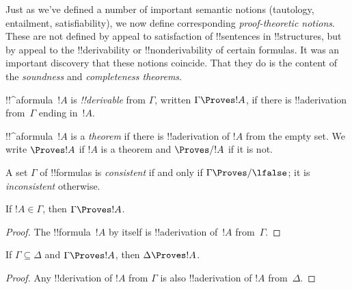

\begin{explain}
Just as we've defined a number of important semantic notions
(tautology, entailment, satisfiability), we now
define corresponding \emph{proof-theoretic notions}.  These are not
defined by appeal to satisfaction of !!{sentence}s in !!{structure}s,
but by appeal to the !!{derivability} or !!{nonderivability} of
certain formulas.  It was an important discovery that these notions
coincide.  That they do is the content of the \emph{soundness} and
\emph{completeness theorems}.
\end{explain}

\begin{defn}[!!^{derivability}]
!!^a{formula}~$!A$ is \emph{!!{derivable}} from $\Gamma$, written
$\Gamma \Proves !A$, if there is !!a{derivation} from~$\Gamma$ ending
in~$!A$.
\end{defn}

\begin{defn}[Theorems]
!!^a{formula}~$!A$ is a \emph{theorem} if there is !!a{derivation} of
$!A$ from the empty set.  We write $\Proves !A$ if $!A$ is a theorem
and $\Proves/ !A$ if it is not.
\end{defn}

\begin{defn}[Consistency]
A set $\Gamma$ of !!{formula}s is \emph{consistent} if and only if
$\Gamma\Proves/ \lfalse$; it is \emph{inconsistent} otherwise.
\end{defn}

\begin{prop}[Reflexivity]
If $!A \in \Gamma$, then $\Gamma \Proves !A$.
\end{prop}

\begin{proof}
  The !!{formula}~$!A$ by itself is !!a{derivation} of~$!A$ from~$\Gamma$.
\end{proof}

\begin{prop}[Monotonicity]
If $\Gamma \subseteq \Delta$ and $\Gamma \Proves !A$, then $\Delta
\Proves !A$.
\end{prop}

\begin{proof}
Any !!{derivation} of $!A$ from $\Gamma$ is also !!a{derivation} of
$!A$ from~$\Delta$.
\end{proof}

